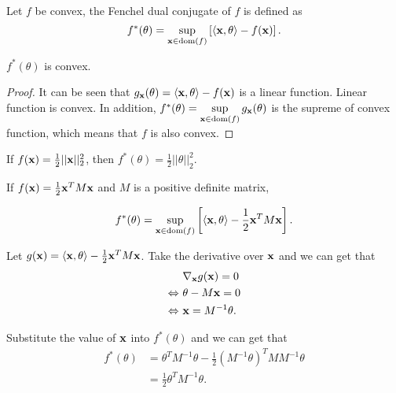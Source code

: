 \documentclass[../main.tex]{subfiles}
\begin{document}
\begin{definition}
	Let $f$ be convex, the Fenchel dual conjugate of $f$ is defined as
	\begin{equation}
		f^*(\theta) = \sup\limits_{\mathbf{x}\in \textmd{dom}(f)} \left[ \langle \mathbf{x}, \theta \rangle - f(\mathbf{x})\right].
	\end{equation}
\end{definition}

\begin{claim}
	$f^*(\theta)$ is convex.
\end{claim}

\begin{proof}
	It can be seen that $ g_{\mathbf{x}}(\theta) = \langle \mathbf{x}, \theta \rangle - f(\mathbf{x})$ is a linear function. Linear function is convex. In addition, $f^*(\theta) = \sup\limits_{\mathbf{x}\in \textmd{dom}(f)} g_{\mathbf{x}}(\theta)$ is the supreme of convex function, which means that $f$ is also convex.  
\end{proof}

\begin{example}
	If $f(\mathbf{x}) = \frac{1}{2} ||\mathbf{x}||_2^2$, then $f^*(\theta) = \frac{1}{2} ||\theta||_2^2$.
\end{example}

\begin{example}
	If $f(\mathbf{x}) = \frac{1}{2}\mathbf{x}^T M \mathbf{x}$ and $M$ is a positive definite matrix, 
	
	\begin{equation*}
	f^*(\theta) = \sup\limits_{\mathbf{x}\in \textmd{dom}(f)} \left[ \langle \mathbf{x}, \theta \rangle -  \frac{1}{2}\mathbf{x}^T M \mathbf{x} \right].
	\end{equation*}
	
	Let $g(\mathbf{x}) =\langle \mathbf{x}, \theta \rangle -  \frac{1}{2}\mathbf{x}^T M \mathbf{x} $. Take the derivative over $\mathbf{x}$ and we can get that
	\begin{equation*}
	\begin{aligned}
		&	\nabla_{\mathbf{x}} g(\mathbf{x}) = 0\\
	\Leftrightarrow\ & \theta - M \mathbf{x} = 0\\
	\Leftrightarrow\ & \mathbf{x} = M^{-1} \theta. 
	\end{aligned}
	\end{equation*}
	
	Substitute the value of $\mathbf{x}$ into $f^*(\theta)$ and we can get that 
	\begin{equation*}
		\begin{aligned}
				f^*(\theta) &= \theta^T M^{-1}\theta - \frac{1}{2} (M^{-1}\theta)^T M M^{-1}\theta\\
							&= \frac{1}{2} \theta^T M^{-1} \theta.
		\end{aligned}
	\end{equation*}
\end{example}
\end{document}
